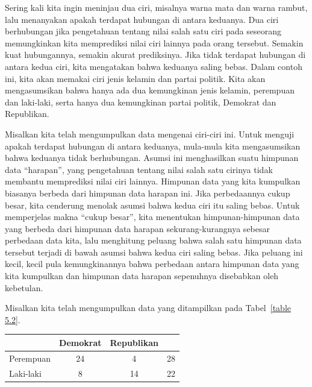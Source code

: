 \begin{example}\label{exam 5.6} Sering kali kita ingin meninjau dua ciri, misalnya
warna mata dan warna rambut, lalu menanyakan apakah terdapat hubungan di antara
keduanya. Dua ciri berhubungan jika pengetahuan tentang nilai salah satu ciri pada
seseorang memungkinkan kita memprediksi nilai ciri lainnya pada orang tersebut.
Semakin kuat hubungannya, semakin akurat prediksinya. Jika tidak terdapat hubungan
di antara kedua ciri, kita mengatakan bahwa keduanya saling bebas. Dalam contoh ini,
kita akan memakai ciri jenis kelamin dan partai politik. Kita akan mengasumsikan bahwa
hanya ada dua kemungkinan jenis kelamin, perempuan dan laki-laki, serta hanya dua
kemungkinan partai politik, Demokrat dan Republikan.
\par Misalkan kita telah mengumpulkan data mengenai ciri-ciri ini. Untuk menguji
apakah terdapat hubungan di antara keduanya, mula-mula kita mengasumsikan bahwa
keduanya tidak berhubungan. Asumsi ini menghasilkan suatu himpunan data ``harapan'',
yang pengetahuan tentang nilai salah satu cirinya tidak membantu memprediksi nilai
ciri lainnya. Himpunan data yang kita kumpulkan biasanya berbeda dari himpunan data
harapan ini. Jika perbedaannya cukup besar, kita cenderung menolak asumsi bahwa kedua
ciri itu saling bebas. Untuk memperjelas makna ``cukup besar'', kita menentukan
himpunan-himpunan data yang berbeda dari himpunan data harapan sekurang-kurangnya
sebesar perbedaan data kita, lalu menghitung peluang bahwa salah satu himpunan data
tersebut terjadi di bawah asumsi bahwa kedua ciri saling bebas. Jika peluang ini
kecil, kecil pula kemungkinannya bahwa perbedaan antara himpunan data yang kita
kumpulkan dan himpunan data harapan sepenuhnya disebabkan oleh kebetulan.
\par Misalkan kita telah mengumpulkan data yang ditampilkan pada Tabel~\ref{table 5.2}.
\begin{table}
\centering
\begin{tabular}{|l|c|c|c|}
\hline
       & \hspace{.15in}Demokrat\hspace{.15in} & \hspace{.1in}Republikan\hspace{.1in} & \\ \hline 
\hspace{.1in}Perempuan & 24                  &\hspace{.02in} 4 & \hspace{.2in} 28  \\ \hline 
\hspace{.1in}Laki-laki   &\hspace{.075in}8     & 14               & \hspace{.2in} 22  \\ \hline

\end{tabular}
\end{table}
\end{example}
